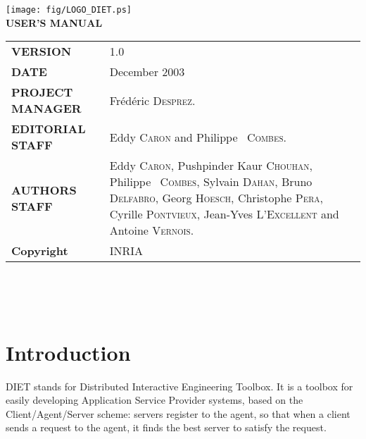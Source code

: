 \documentclass[12pt,a4paper]{book}
\begin{document}

\thispagestyle{empty}
\vspace*{3cm}
\vspace*{3cm}

\begin{center}
\texttt{[image: fig/LOGO\_DIET.ps]}\\[2ex]
\textbf{\Huge USER'S MANUAL\\[2ex]}
\end{center}

\vfill


\noindent
\small{
\begin{tabular}{ll}
  \textbf{VERSION}  & 1.0\\
  \textbf{DATE}     & December 2003\\
  \textbf{PROJECT MANAGER}  & Fr\'ed\'eric \textsc{Desprez}.\\
  \textbf{EDITORIAL STAFF}  & Eddy \textsc{Caron} and Philippe ~\textsc{Combes}.\\
  \textbf{AUTHORS STAFF}    & 
\begin{minipage}[t]{12cm}
  Eddy \textsc{Caron}, Pushpinder Kaur \textsc{Chouhan}, Philippe ~\textsc{Combes},
  Sylvain \textsc{Dahan}, Bruno \textsc{Delfabro}, Georg \textsc{Hoesch}, Christophe \textsc{Pera}, Cyrille \textsc{Pontvieux}, Jean-Yves \textsc{L'Excellent} and Antoine \textsc{Vernois}.
\end{minipage} \\
  \textbf{Copyright}& INRIA
\end{tabular}\\
}

\newpage
\thispagestyle{empty}
\ 



\newpage
\tableofcontents


%
%
\newpage
{}
\chapter*{Introduction}


DIET stands for Distributed Interactive Engineering Toolbox. It is a toolbox for
easily developing Application Service Provider systems, based on the
Client/Agent/Server scheme: servers register to the agent, so that when a client
sends a request to the agent, it finds the best server to satisfy the
request.
\end{document}
